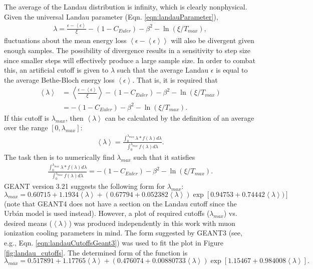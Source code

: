 The average of the Landau distribution is infinity, which is clearly nonphysical. Given the universal Landau parameter (Eqn. \ref{eqn:landauParameter}), 
\begin{align*}
\lambda=\frac{\epsilon-\left<\epsilon\right>}{\xi}-(1-C_{Euler})-\beta ^2 -\ln (\xi/T_{max}),
\end{align*}
fluctuations about the mean energy loss $\left<\epsilon-\left<\epsilon\right>\right>$ will also be divergent given enough samples. The possibility of divergence results in a sensitivity to step size since smaller steps will effectively produce a large sample size. In order to combat this, an artificial cutoff is given to $\lambda$ such that the average Landau $\epsilon$ is equal to the average Bethe-Bloch energy loss $\left<\epsilon\right>$. That is, it is required that
\begin{align*}
\left<\lambda\right>&=\left<\frac{\epsilon-\left<\epsilon\right>}{\xi}\right>-(1-C_{Euler})-\beta^2-\ln(\xi/T_{max})\\
&=-(1-C_{Euler})-\beta^2-\ln(\xi/T_{max}).
\end{align*}
If this cutoff is $\lambda_{max}$, then $\left<\lambda\right>$ can be calculated by the definition of an average over the range $[0,\lambda_{max}]$:
\begin{align*}
\left<\lambda\right>=\frac{\int_0 ^{\lambda_{max}} \lambda * f(\lambda) d\lambda}{\int_0 ^{\lambda_{max}}f(\lambda) d\lambda}.
\end{align*}
The task then is to numerically find $\lambda_{max}$ such that it satisfies
\begin{align*}
\frac{\int_0 ^{\lambda_{max}} \lambda * f(\lambda) d\lambda}{\int_0 ^{\lambda_{max}}f(\lambda) d\lambda}=-(1-C_{Euler})-\beta^2-\ln(\xi/T_{max}).
\end{align*}
GEANT version 3.21 \cite{geant3.21} suggests the following form for $\lambda_{max}$:
\begin{equation} \label{eqn:landauCutoffsGeant3}
\lambda_{max}=0.60715+1.1934\left<\lambda\right>+(0.67794+0.052382\left<\lambda\right>)\exp[0.94753+0.74442\left<\lambda\right>)]
\end{equation}
(note that GEANT4 does not have a section on the Landau cutoff since the Urb\'{a}n model is used instead). However, a plot of required cutoffs ($\lambda_{max}$) vs. desired means ($\left<\lambda\right>$) was produced independently in this work with muon ionization cooling parameters in mind. The form suggested by GEANT3 (see, e.g., Eqn. \ref{eqn:landauCutoffsGeant3}) was used to fit the plot in Figure \ref{fig:landau_cutoffs}. The determined form of the function is
\begin{equation}\label{eqn:landauCutoffs}
\lambda_{max}=0.517891+1.17765\left<\lambda\right>+(0.476074+0.00880733\left<\lambda\right>)\exp[1.15467+0.984008\left<\lambda\right>].
\end{equation}

